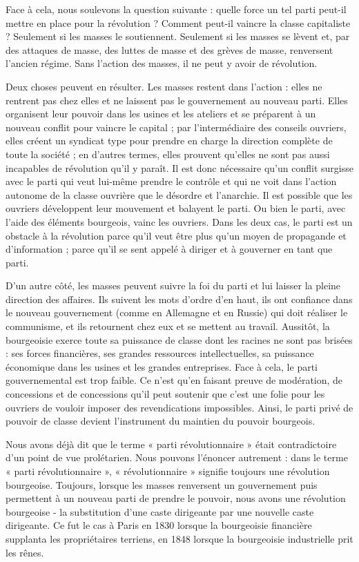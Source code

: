 Face à cela, nous soulevons la question suivante : quelle force un tel parti peut-il mettre en place pour la révolution ? Comment peut-il vaincre la classe capitaliste ? Seulement si les masses le soutiennent. Seulement si les masses se lèvent et, par des attaques de masse, des luttes de masse et des grèves de masse, renversent l'ancien régime. Sans l'action des masses, il ne peut y avoir de révolution.

Deux choses peuvent en résulter. Les masses restent dans l'action : elles ne rentrent pas chez elles et ne laissent pas le gouvernement au nouveau parti. Elles organisent leur pouvoir dans les usines et les ateliers et se préparent à un nouveau conflit pour vaincre le capital ; par l'intermédiaire des conseils ouvriers, elles créent un syndicat type pour prendre en charge la direction complète de toute la société ; en d'autres termes, elles prouvent qu'elles ne sont pas aussi incapables de révolution qu'il y paraît. Il est donc nécessaire qu'un conflit surgisse avec le parti qui veut lui-même prendre le contrôle et qui ne voit dans l'action autonome de la classe ouvrière que le désordre et l'anarchie. Il est possible que les ouvriers développent leur mouvement et balayent le parti. Ou bien le parti, avec l'aide des éléments bourgeois, vainc les ouvriers. Dans les deux cas, le parti est un obstacle à la révolution parce qu'il veut être plus qu'un moyen de propagande et d'information ; parce qu'il se sent appelé à diriger et à gouverner en tant que parti.

D'un autre côté, les masses peuvent suivre la foi du parti et lui laisser la pleine direction des affaires. Ils suivent les mots d’ordre d’en haut, ils ont confiance dans le nouveau gouvernement (comme en Allemagne et en Russie) qui doit réaliser le communisme, et ils retournent chez eux et se mettent au travail. Aussitôt, la bourgeoisie exerce toute sa puissance de classe dont les racines ne sont pas brisées : ses forces financières, ses grandes ressources intellectuelles, sa puissance économique dans les usines et les grandes entreprises. Face à cela, le parti gouvernemental est trop faible. Ce n’est qu’en faisant preuve de modération, de concessions et de concessions qu’il peut soutenir que c’est une folie pour les ouvriers de vouloir imposer des revendications impossibles. Ainsi, le parti privé de pouvoir de classe devient l’instrument du maintien du pouvoir bourgeois.

Nous avons déjà dit que le terme « parti révolutionnaire » était contradictoire d'un point de vue prolétarien. Nous pouvons l'énoncer autrement : dans le terme « parti révolutionnaire », « révolutionnaire » signifie toujours une révolution bourgeoise. Toujours, lorsque les masses renversent un gouvernement puis permettent à un nouveau parti de prendre le pouvoir, nous avons une révolution bourgeoise - la substitution d'une caste dirigeante par une nouvelle caste dirigeante. Ce fut le cas à Paris en 1830 lorsque la bourgeoisie financière supplanta les propriétaires terriens, en 1848 lorsque la bourgeoisie industrielle prit les rênes.

